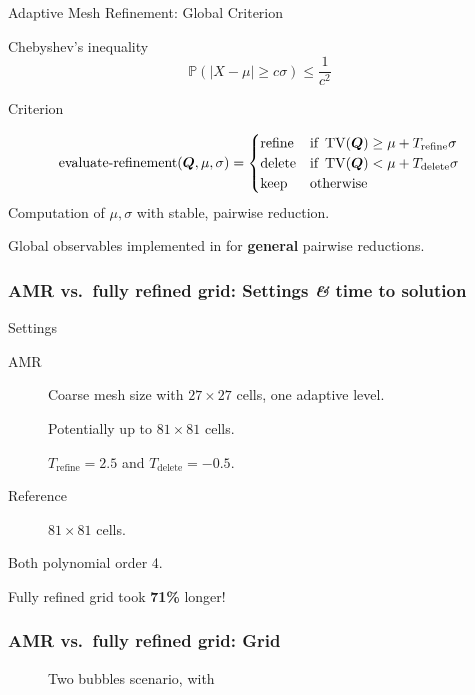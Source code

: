 \documentclass[aspectratio=169]{beamer}
\begin{document}
\begin{frame}{Adaptive Mesh Refinement: Global Criterion}
  \begin{block}{Chebyshev's inequality}
\begin{equation}
  \label{eq:chebychev}
  \mathbb{P}(\vert X - \mu \vert \geq c \sigma) \leq \frac{1}{c^2}
\end{equation}
\end{block}
  
\begin{block}{Criterion}
  
\begin{equation}
  \label{eq:refinement-criterion}
  \operatorname{evaluate-refinement}(\bm{Q}, \mu, \sigma) =
  \begin{cases}
    \text{refine} & \text{if } \operatorname{TV}(\bm{Q}) \geq \mu + T_\text{refine} \sigma \\
    \text{delete} & \text{if } \operatorname{TV}(\bm{Q}) < \mu + T_\text{delete} \sigma \\
    \text{keep} & \text{otherwise}
    \end{cases}
\end{equation}
Computation of $\mu, \sigma$ with stable, pairwise reduction.

Global observables implemented in \exahype{} for \textbf{general} pairwise reductions.
\end{block}
\end{frame}  

\begin{frame}
  \frametitle{AMR vs.\ fully refined grid: Settings \textit{\&} time
    to solution}
  \begin{block}{Settings}
    \begin{description}
    \item[AMR] Coarse mesh size with $27 \times 27$ cells, one adaptive level.

      Potentially up to $81 \times 81$ cells.

      $T_\text{refine} = 2.5$ and $T_\text{delete} = -0.5$.
    \item[Reference] $81 \times 81$ cells.
    \end{description}
  \end{block}
  Both polynomial order 4.

  Fully refined grid took \textbf{71\%} longer!
\end{frame}


\begin{frame}
  \frametitle{AMR vs.\ fully refined grid: Grid}
   \begin{figure}[h]
    \centering
    \caption{Two bubbles scenario, with \amr{}}
  \end{figure}
\end{frame}
\end{document}
